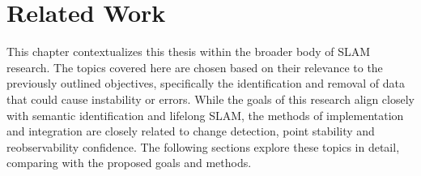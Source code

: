 \section{Related Work}
\label{sec:related_work}

This chapter contextualizes this thesis within the broader body of SLAM research. The topics covered here are chosen based on their relevance to the previously outlined objectives, specifically the identification and removal of data that could cause instability or errors. While the goals of this research align closely with semantic identification and lifelong SLAM, the methods of implementation and integration are  closely related to change detection, point stability and reobservability confidence. The following sections explore these topics in detail, comparing with the proposed goals and methods.

% 